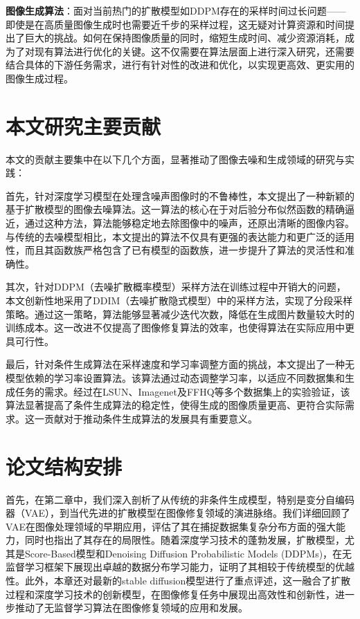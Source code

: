 \textbf{图像生成算法}：面对当前热门的扩散模型如DDPM存在的采样时间过长问题——即使是在高质量图像生成时也需要近千步的采样过程，这无疑对计算资源和时间提出了巨大的挑战。如何在保持图像质量的同时，缩短生成时间、减少资源消耗，成为了对现有算法进行优化的关键。这不仅需要在算法层面上进行深入研究，还需要结合具体的下游任务需求，进行有针对性的改进和优化，以实现更高效、更实用的图像生成过程。 








\section{本文研究主要贡献}
本文的贡献主要集中在以下几个方面，显著推动了图像去噪和生成领域的研究与实践：

首先，针对深度学习模型在处理含噪声图像时的不鲁棒性，本文提出了一种新颖的基于扩散模型的图像去噪算法。这一算法的核心在于对后验分布似然函数的精确逼近，通过这种方法，算法能够稳定地去除图像中的噪声，还原出清晰的图像内容。与传统的去噪模型相比，本文提出的算法不仅具有更强的表达能力和更广泛的适用性，而且其函数族严格包含了已有模型的函数族，进一步提升了算法的灵活性和准确性。

其次，针对DDPM（去噪扩散概率模型）采样方法在训练过程中开销大的问题，本文创新性地采用了DDIM（去噪扩散隐式模型）中的采样方法，实现了分段采样策略。通过这一策略，算法能够显著减少迭代次数，降低在生成图片数量较大时的训练成本。这一改进不仅提高了图像修复算法的效率，也使得算法在实际应用中更具可行性。

最后，针对条件生成算法在采样速度和学习率调整方面的挑战，本文提出了一种无模型依赖的学习率设置算法。该算法通过动态调整学习率，以适应不同数据集和生成任务的需求。经过在LSUN、Imagenet及FFHQ等多个数据集上的实验验证，该算法显著提高了条件生成算法的稳定性，使得生成的图像质量更高、更符合实际需求。这一贡献对于推动条件生成算法的发展具有重要意义。
\section{论文结构安排}
首先，在第二章中，我们深入剖析了从传统的非条件生成模型，特别是变分自编码器（VAE），到当代先进的扩散模型在图像修复领域的演进脉络。我们详细回顾了VAE在图像处理领域的早期应用，评估了其在捕捉数据集复杂分布方面的强大能力，同时也指出了其存在的局限性。随着深度学习技术的蓬勃发展，扩散模型，尤其是Score-Based模型和Denoising Diffusion Probabilistic Models (DDPMs)，在无监督学习框架下展现出卓越的数据分布学习能力，证明了其相较于传统模型的优越性。此外，本章还对最新的stable diffusion模型进行了重点评述，这一融合了扩散过程和深度学习技术的创新模型，在图像修复任务中展现出高效性和创新性，进一步推动了无监督学习算法在图像修复领域的应用和发展。

